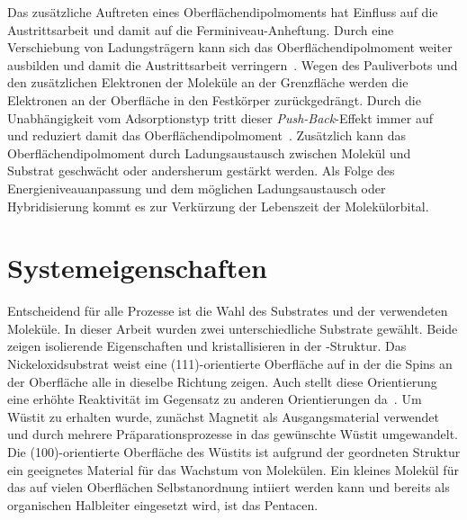             Das zusätzliche Auftreten eines Oberflächendipolmoments hat Einfluss auf die Austrittsarbeit und damit auf die Ferminiveau-Anheftung.
            Durch eine Verschiebung von Ladungsträgern kann sich das Oberflächendipolmoment weiter ausbilden und damit die Austrittsarbeit verringern~\cite{5A_5}.
            Wegen des Pauliverbots und den zusätzlichen Elektronen der Moleküle an der Grenzfläche werden die Elektronen an der Oberfläche in den Festkörper zurückgedrängt.
            Durch die Unabhängigkeit vom Adsorptionstyp tritt dieser \textit{Push-Back}-Effekt immer auf~\cite{IF_4} und reduziert damit das Oberflächendipolmoment~\cite{IF_1}.
            Zusätzlich kann das Oberflächendipolmoment durch Ladungsaustausch zwischen Molekül und Substrat geschwächt oder andersherum gestärkt werden.
            Als Folge des Energieniveauanpassung und dem möglichen Ladungsaustausch oder Hybridisierung kommt es zur Verkürzung der Lebenszeit der Molekülorbital.


    \section{Systemeigenschaften} \label{sec:Systeme}
        Entscheidend für alle Prozesse ist die Wahl des Substrates und der verwendeten Moleküle.
        In dieser Arbeit wurden zwei unterschiedliche Substrate gewählt.
        Beide zeigen isolierende Eigenschaften und kristallisieren in der -Struktur.
        Das Nickeloxidsubstrat weist eine (111)-orientierte Oberfläche auf in der die Spins an der Oberfläche alle in dieselbe Richtung zeigen.
        Auch stellt diese Orientierung eine erhöhte Reaktivität im Gegensatz zu anderen Orientierungen da~\cite{cappus_hydroxyl_1993}. %
        Um Wüstit zu erhalten wurde, zunächst Magnetit als Ausgangsmaterial verwendet und durch mehrere Präparationsprozesse in das gewünschte Wüstit umgewandelt.
        Die (100)-orientierte Oberfläche des Wüstits ist aufgrund der geordneten Struktur ein geeignetes Material für das Wachstum von Molekülen.
        Ein kleines Molekül für das auf vielen Oberflächen Selbstanordnung intiiert werden kann und bereits als organischen Halbleiter eingesetzt wird, ist das Pentacen.

